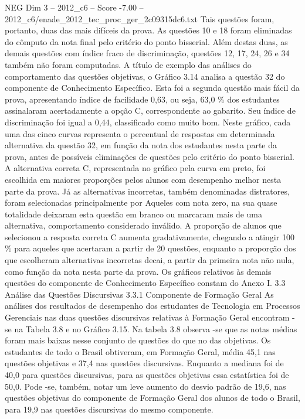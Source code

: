 \begin{textsample}{NEG Dim 3 – 2012\_c6 – Score -7.00 – 2012\_c6/enade\_2012\_tec\_proc\_ger\_2c09315dc6.txt}
Tais questões foram, portanto, duas das mais difíceis da prova.
As questões 10 e 18 foram eliminadas do cômputo da nota final pelo critério do ponto bisserial.
Além destas duas, as demais questões com índice fraco de discriminação, questões 12, 17, 24, 26 e 34 também não foram computadas.
A título de exemplo das análises do comportamento das questões objetivas, o Gráfico 3.14 analisa a questão 32 do componente de Conhecimento Específico.
Esta foi a segunda questão mais fácil da prova, apresentando índice de facilidade 0,63, ou seja, 63,0 \% dos estudantes assinalaram acertadamente a opção C, correspondente ao gabarito.
Seu índice de discriminação foi igual a 0,44, classificado como muito bom.
Neste gráfico, cada uma das cinco curvas representa o percentual de respostas em determinada alternativa da questão 32, em função da nota dos estudantes nesta parte da prova, antes de possíveis eliminações de questões pelo critério do ponto bisserial.
A alternativa correta C, representada no gráfico pela curva em preto, foi escolhida em maiores proporções pelos alunos com desempenho melhor nesta parte da prova.
Já as alternativas incorretas, também denominadas distratores, foram selecionadas principalmente por Aqueles com nota zero, na sua quase totalidade deixaram esta questão em branco ou marcaram mais de uma alternativa, comportamento considerado inválido.
A proporção de alunos que selecionou a resposta correta C aumenta gradativamente, chegando a atingir 100 \% para aqueles que acertaram a partir de 20 questões, enquanto a proporção dos que escolheram alternativas incorretas decai, a partir da primeira nota não nula, como função da nota nesta parte da prova.
Os gráficos relativos às demais questões do componente de Conhecimento Específico constam do Anexo I. 3.3 Análise das Questões Discursivas 3.3.1 Componente de Formação Geral As análises dos resultados de desempenho dos estudantes de Tecnologia em Processos Gerenciais nas duas questões discursivas relativas à Formação Geral encontram -se na Tabela 3.8 e no Gráfico 3.15.
Na tabela 3.8 observa -se que as notas médias foram mais baixas nesse conjunto de questões do que no das objetivas.
Os estudantes de todo o Brasil obtiveram, em Formação Geral, média 45,1 nas questões objetivas e 37,4 nas questões discursivas.
Enquanto a mediana foi de 40,0 para questões discursivas, para as questões objetivas essa estatística foi de 50,0.
Pode -se, também, notar um leve aumento do desvio padrão de 19,6, nas questões objetivas do componente de Formação Geral dos alunos de todo o Brasil, para 19,9 nas questões discursivas do mesmo componente.

\end{textsample}

